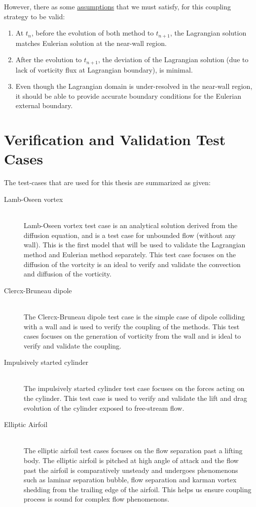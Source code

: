 However, there as some \underline{assumptions} that we must satisfy, for this coupling strategy to be valid:

	\begin{enumerate}
	\item At $t_n$, before the evolution of both method to $t_{n+1}$, the Lagrangian solution matches Eulerian solution at the near-wall region.
	\item After the evolution to $t_{n+1}$, the deviation of the Lagrangian solution (due to lack of vorticity flux at Lagrangian boundary), is minimal.
	\item Even though the Lagrangian domain is under-resolved in the near-wall region, it should be able to provide accurate boundary conditions for the Eulerian external boundary.
	\end{enumerate}


\section{Verification and Validation Test Cases}

The test-cases that are used for this thesis are summarized as given:

	\begin{description}
	\item[Lamb-Oseen vortex] \cite{Lamb1993} \cite{Tryggeson2007} \hfill\\
	Lamb-Oseen vortex test case is an analytical solution derived from the diffusion equation, and is a test case for unbounded flow (without any wall). This is the first model that will be used to validate the Lagrangian method and Eulerian method separately. This test case focuses on the diffusion of the vortcity is an ideal to verify and validate the convection and diffusion of the vorticity.
	\item[Clercx-Bruneau dipole] \cite{Clercx2006}\hfill\\
	The Clercx-Bruneau dipole test case is the simple case of dipole colliding with a wall and is used to verify the coupling of the methods. This test cases focuses on the generation of vorticity from the wall and is ideal to verify and validate the coupling.
	\item[Impulsively started cylinder] \cite{LEONARD1995} \cite{Chang2006} \cite{Chassaing1986} \cite{Lecointe1985}\hfill\\
	The impulsively started cylinder test case focuses on the forces acting on the cylinder. This test case is used to verify and validate the lift and drag evolution of the cylinder exposed to free-stream flow.
	\item[Elliptic Airfoil] \cite{Nair1997}\hfill\\
	The elliptic airfoil test cases focuses on the flow separation past a lifting body. The elliptic airfoil is pitched at high angle of attack and the flow past the airfoil is comparatively unsteady and undergoes phenomenons such as laminar separation bubble, flow separation and karman vortex shedding from the trailing edge of the airfoil. This helps us ensure coupling process is sound for complex flow phenomenons.
	\end{description}

